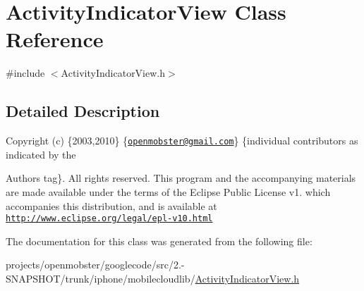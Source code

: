 \hypertarget{interface_activity_indicator_view}{
\section{\-Activity\-Indicator\-View \-Class \-Reference}
\label{interface_activity_indicator_view}
}


{\ttfamily \#include $<$\-Activity\-Indicator\-View.\-h$>$}



\subsection{\-Detailed \-Description}
\-Copyright (c) \{2003,2010\} \{\href{mailto:openmobster@gmail.com}{\tt openmobster@gmail.\-com}\} \{individual contributors as indicated by the \begin{DoxyAuthor}{\-Authors}
tag\}. \-All rights reserved. \-This program and the accompanying materials are made available under the terms of the \-Eclipse \-Public \-License v1. which accompanies this distribution, and is available at \href{http://www.eclipse.org/legal/epl-v10.html}{\tt http\-://www.\-eclipse.\-org/legal/epl-\/v10.\-html} 
\end{DoxyAuthor}


\-The documentation for this class was generated from the following file\-:\begin{DoxyCompactItemize}
\item 
projects/openmobster/googlecode/src/2.-\/\-S\-N\-A\-P\-S\-H\-O\-T/trunk/iphone/mobilecloudlib/\hyperlink{_activity_indicator_view_8h}{\-Activity\-Indicator\-View.\-h}\end{DoxyCompactItemize}
